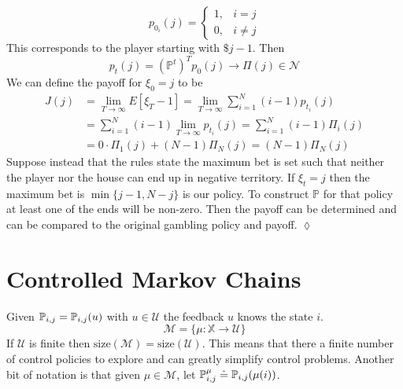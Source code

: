 \begin{example}
$$p_{0_i}(j) = \begin{cases} 1, & i=j \\ 0, & i\neq j \end{cases}$$
This corresponds to the player starting with $\$j-1$. Then
$$p_t(j) = (\mathbb{P}^t)^Tp_0(j) \rightarrow \Pi(j)\in\mathcal{N}$$
We can define the payoff for $\xi_0=j$ to be
\begin{align*}
J(j) &= \lim_{T\to\infty}E[\xi_T-1] = \lim_{T\to\infty}\sum_{i=1}^N (i-1)p_{t_i}(j) \\
&= \sum_{i=1}^N (i-1)\lim_{T\to\infty} p_{t_i}(j) = \sum_{i=1}^N (i-1) \Pi_i(j) \\
&= 0\cdot \Pi_1(j) + (N-1)\Pi_N(j) = (N-1)\Pi_N(j)
\end{align*}
Suppose instead that the rules state the maximum bet is set such that neither the player nor the house can end up in negative territory. If $\xi_t=j$ then the maximum bet is $\min\{j-1,N-j\}$ is our policy. To construct $\mathbb{P}$ for that policy at least one of the ends will be non-zero. Then the payoff can be determined and can be compared to the original gambling policy and payoff.
$\lozenge$
\end{example}

\section{Controlled Markov Chains}
Given $\mathbb{P}_{i,j}=\mathbb{P}_{i,j}(u)$ with $u\in\mathcal{U}$ the feedback $u$ knows the state $i$.
$$\mathcal{M}=\{\mu:\mathbb{X}\rightarrow\mathcal{U}\}$$
If $\mathcal{U}$ is finite then $\text{size}(\mathcal{M})=\text{size}(\mathcal{U})$. This means that there a finite number of control policies to explore and can greatly simplify control problems. Another bit of notation is that given $\mu\in\mathcal{M}$, let $\mathbb{P}_{i,j}^\mu \doteq \mathbb{P}_{i,j}(\mu(i))$.

